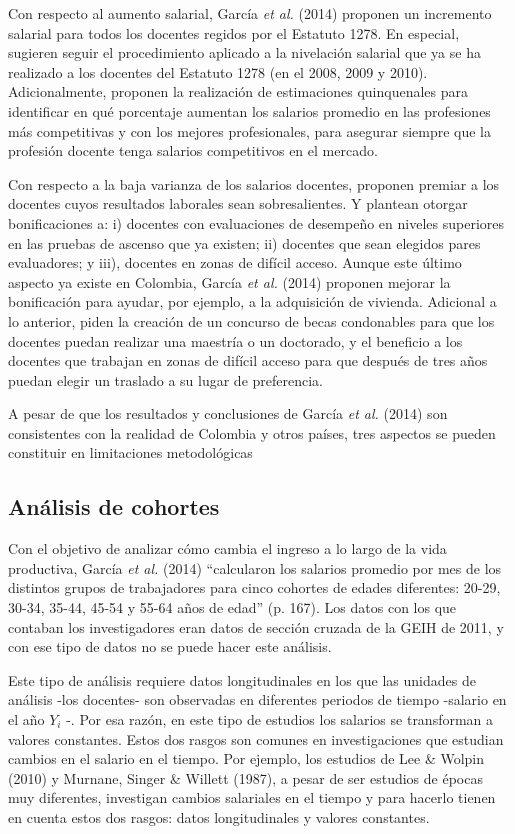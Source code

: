 \documentclass[a4paper]{article}
\begin{document}
Con respecto al aumento salarial, García \textit{et al.} (2014) proponen un incremento salarial para todos los docentes regidos por el Estatuto 1278. En especial, sugieren seguir el procedimiento aplicado a la nivelación salarial que ya se ha realizado a los docentes del Estatuto 1278 (en el 2008, 2009 y 2010). Adicionalmente, proponen la realización de estimaciones quinquenales para identificar en qué porcentaje aumentan los salarios promedio en las profesiones más competitivas y con los mejores profesionales, para asegurar siempre que la profesión docente tenga salarios competitivos en el mercado.

Con respecto a la baja varianza de los salarios docentes, proponen premiar a los docentes cuyos resultados laborales sean sobresalientes. Y plantean otorgar bonificaciones a: i) docentes con evaluaciones de desempeño en niveles superiores en las pruebas de ascenso que ya existen; ii) docentes que sean elegidos pares evaluadores; y iii), docentes en zonas de difícil acceso. Aunque este último aspecto ya existe en Colombia, García \textit{et al.} (2014) proponen mejorar la bonificación para ayudar, por ejemplo, a la adquisición de vivienda. Adicional a lo anterior, piden la creación de un concurso de becas condonables para que los docentes puedan realizar una maestría o un doctorado, y el beneficio a los docentes que trabajan en zonas de difícil acceso para que después de tres años puedan elegir un traslado a su lugar de preferencia.

A pesar de que los resultados y conclusiones de García \textit{et al.} (2014) son consistentes con la realidad de Colombia y otros países, tres aspectos se pueden constituir en limitaciones metodológicas

   \subsection{Análisis de cohortes}
Con el objetivo de analizar cómo cambia el ingreso a lo largo de la vida productiva, García \textit{et al.} (2014) “calcularon los salarios promedio por mes de los distintos grupos de trabajadores para cinco cohortes de edades diferentes: 20-29, 30-34, 35-44, 45-54 y 55-64 años de edad” (p. 167). Los datos con los que contaban los investigadores eran datos de sección cruzada de la GEIH de 2011, y con ese tipo de datos no se puede hacer este análisis.

Este tipo de análisis requiere datos longitudinales en los que las unidades de análisis -los docentes- son observadas en diferentes periodos de tiempo -salario en el año $Y_i$ -. Por esa razón, en este tipo de estudios los salarios se transforman a valores constantes. Estos dos rasgos son comunes en investigaciones que estudian cambios en el salario en el tiempo. Por ejemplo, los estudios de Lee \& Wolpin (2010) y Murnane, Singer \& Willett (1987), a pesar de ser estudios de épocas muy diferentes, investigan cambios salariales en el tiempo y para hacerlo tienen en cuenta estos dos rasgos: datos longitudinales y valores constantes. 
\end{document}
